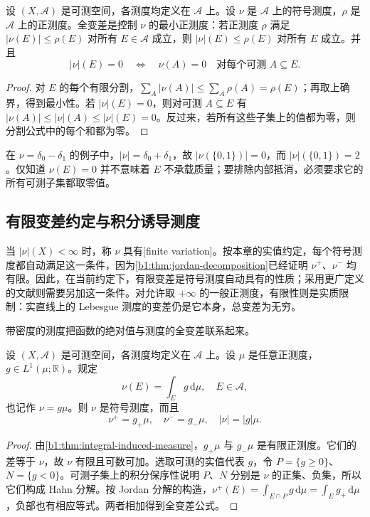 \begin{proposition}\label{b1:prop:variation-minimal-control}
设 \((X,\mathcal A)\) 是可测空间，各测度均定义在 \(\mathcal A\) 上。设 \(\nu\) 是 \(\mathcal A\) 上的符号测度，\(\rho\) 是 \(\mathcal A\) 上的正测度。全变差是控制 \(\nu\) 的最小正测度：若正测度 \(\rho\) 满足 \(|\nu(E)|\leq\rho(E)\) 对所有 \(E\in\mathcal A\) 成立，则 \(|\nu|(E)\leq\rho(E)\) 对所有 \(E\) 成立。并且
\[
|\nu|(E)=0
\quad\Longleftrightarrow\quad
\nu(A)=0\quad\text{对每个可测 }A\subseteq E.
\]
\end{proposition}
\begin{proof}
对 \(E\) 的每个有限分割，\(\sum_A|\nu(A)|\leq\sum_A\rho(A)=\rho(E)\)；再取上确界，得到最小性。若 \(|\nu|(E)=0\)，则对可测 \(A\subseteq E\) 有 \(|\nu(A)|\leq|\nu|(A)\leq|\nu|(E)=0\)。反过来，若所有这些子集上的值都为零，则分割公式中的每个和都为零。
\end{proof}

在 \(\nu=\delta_0-\delta_1\) 的例子中，\(|\nu|=\delta_0+\delta_1\)，故 \(|\nu(\{0,1\})|=0\)，而 \(|\nu|(\{0,1\})=2\)。仅知道 \(\nu(E)=0\) 并不意味着 \(E\) 不承载质量；要排除内部抵消，必须要求它的所有可测子集都取零值。

\subsection{有限变差约定与积分诱导测度}
\label{b1:subsec:060202}

当 \(|\nu|(X)<\infty\) 时，称 \(\nu\) 具有[finite variation]。按本章的实值约定，每个符号测度都自动满足这一条件，因为\cref{b1:thm:jordan-decomposition}已经证明 \(\nu^+\)、\(\nu^-\) 均有限。因此，在当前约定下，有限变差是符号测度自动具有的性质；采用更广定义的文献则需要另加这一条件。对允许取 \(+\infty\) 的一般正测度，有限性则是实质限制：实直线上的 Lebesgue 测度的变差仍是它本身，总变差为无穷。

\ProseParagraphBreak

带密度的测度把函数的绝对值与测度的全变差联系起来。

\begin{proposition}\label{b1:prop:real-density-variation}
设 \((X,\mathcal A)\) 是可测空间，各测度均定义在 \(\mathcal A\) 上。设 \(\mu\) 是任意正测度，\(g\in L^1(\mu;\mathbb R)\)。规定
\[
\nu(E)=\int_E g\,\mathrm d\mu,\quad E\in\mathcal A,
\]
也记作 \(\nu=g\mu\)。则 \(\nu\) 是符号测度，而且
\[
\nu^+=g_+\mu,\quad \nu^-=g_-\mu,\quad |\nu|=|g|\mu.
\]
\end{proposition}
\begin{proof}
由\cref{b1:thm:integral-induced-measure}，\(g_+\mu\) 与 \(g_-\mu\) 是有限正测度。它们的差等于 \(\nu\)，故 \(\nu\) 有限且可数可加。选取可测的实值代表 \(g\)，令 \(P=\{g\geq0\}\)、\(N=\{g<0\}\)。可测子集上的积分保序性说明 \(P\)、\(N\) 分别是 \(\nu\) 的正集、负集，所以它们构成 Hahn 分解。按 Jordan 分解的构造，\(\nu^+(E)=\int_{E\cap P}g\,\mathrm d\mu=\int_Eg_+\,\mathrm d\mu\)，负部也有相应等式。两者相加得到全变差公式。
\end{proof}

